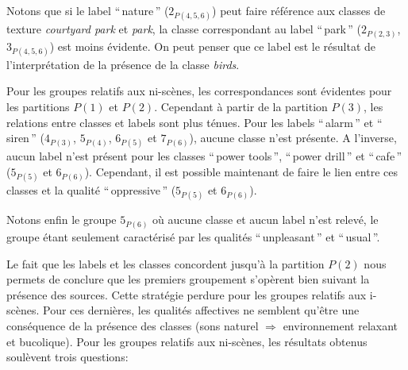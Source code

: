 Notons que si le label ``\,nature\,'' ($2_{P(4,5,6)}$) peut faire référence aux classes de texture \emph{courtyard park} et \emph{park},  la classe correspondant au label ``\,park\,'' ($2_{P(2,3)}$, $3_{P(4,5,6)}$) est moins évidente. On peut penser que ce label est le résultat de l'interprétation de la présence de la classe \emph{birds}.

Pour les groupes relatifs aux ni-scènes, les correspondances sont évidentes pour les partitions $P(1)$ et $P(2)$. Cependant à partir de la partition $P(3)$, les relations entre classes et labels sont plus ténues. Pour les labels ``\,alarm\,'' et ``\,siren\,'' ($4_{P(3)}$, $5_{P(4)}$, $6_{P(5)}$ et $7_{P(6)}$), aucune classe n'est présente. A l'inverse, aucun label n'est présent  pour les classes ``\,power tools\,'', ``\,power drill\,'' et  ``\,cafe\,'' ($5_{P(5)}$ et $6_{P(6)}$). Cependant, il est possible maintenant de faire le lien entre ces classes et la qualité ``\,oppressive\,'' ($5_{P(5)}$ et $6_{P(6)}$).

Notons enfin le groupe $5_{P(6)}$ où aucune classe et aucun label n'est relevé, le groupe étant seulement caractérisé par les qualités ``\,unpleasant\,'' et ``\,usual\,''.

Le fait que les labels et les classes concordent jusqu'à la partition $P(2)$ nous permets de conclure que les premiers groupement s'opèrent bien suivant la présence des sources. Cette stratégie perdure pour les groupes relatifs aux i-scènes. Pour ces dernières, les qualités affectives ne semblent qu'être une conséquence de la présence des classes (sons naturel $\Rightarrow$ environnement relaxant et bucolique). Pour les groupes relatifs aux ni-scènes, les résultats obtenus soulèvent trois questions:

